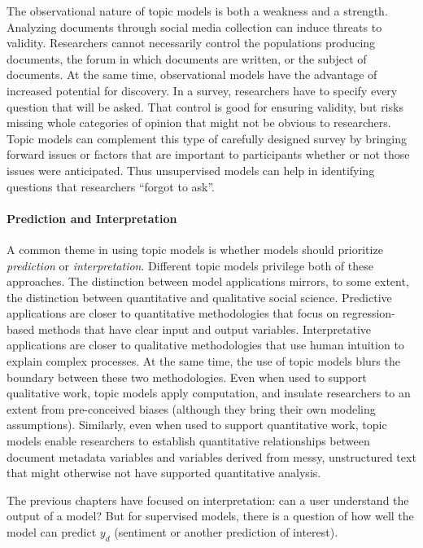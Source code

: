 The observational nature of topic models is both a weakness and a strength.
Analyzing documents through social media collection can induce threats to validity. Researchers cannot necessarily control the populations producing documents, the forum in which documents are written, or the subject of documents.
At the same time, observational models have the advantage of increased potential for discovery.
In a survey, researchers have to specify every question that will be asked.
That control is good for ensuring validity, but risks missing whole categories of opinion that might not be obvious to researchers.
Topic models can complement this type of carefully designed survey by bringing forward issues or factors that are important to participants whether or not those issues were anticipated.
Thus unsupervised models can help in identifying questions that researchers ``forgot to ask''.

\paragraph{Prediction and Interpretation}

A common theme in using topic models is whether models
should prioritize \emph{prediction} or \emph{interpretation}. 
Different topic models privilege both of  these approaches.
The distinction between model applications mirrors, to some extent,  the distinction between quantitative and qualitative social science.
Predictive applications are closer to quantitative methodologies that focus on regression-based methods that have clear input and output variables.
Interpretative applications are closer to qualitative methodologies that use human intuition to explain complex processes.
At the same time, the use of topic models blurs the boundary between these two methodologies.
Even when used to support qualitative work, topic models apply computation, and insulate researchers to an extent from pre-conceived biases (although they bring their own modeling assumptions).
Similarly, even when used to support quantitative work, topic models enable researchers to establish quantitative relationships between document metadata variables and variables derived from messy, unstructured text that might otherwise not have supported  quantitative analysis.

The previous chapters have focused on interpretation: can a user
understand the output of a model?  But for supervised models, there is
a question of how well the model can predict $y_d$ (sentiment or
another prediction of interest).  

